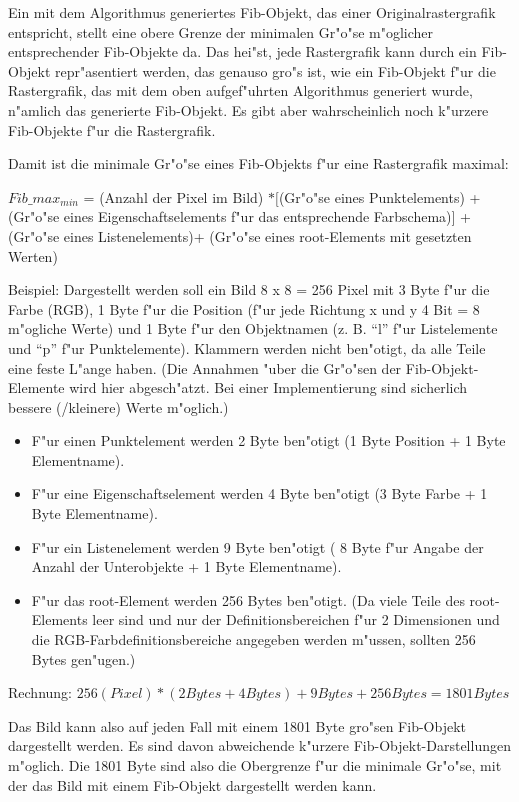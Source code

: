 Ein mit dem Algorithmus generiertes Fib-Objekt, das einer Originalrastergrafik entspricht, stellt eine obere Grenze der minimalen Gr"o"se m"oglicher entsprechender Fib-Objekte da. Das hei"st, jede Rastergrafik kann durch ein Fib-Objekt repr"asentiert werden, das genauso gro"s ist, wie ein Fib-Objekt f"ur die Rastergrafik, das mit dem oben aufgef"uhrten Algorithmus generiert wurde, n"amlich das generierte Fib-Objekt. Es gibt aber wahrscheinlich noch k"urzere Fib-Objekte f"ur die Rastergrafik.

\begin{flushleft}
Damit ist die minimale Gr"o"se eines Fib-Objekts f"ur eine Rastergrafik maximal:

$Fib\_max_{min}$ = (Anzahl der Pixel im Bild) $* [$(Gr"o"se eines Punktelements) + (Gr"o"se eines Eigenschaftselements f"ur das entsprechende Farbschema)$]$ + (Gr"o"se eines Listenelements)+ (Gr"o"se eines root-Elements mit gesetzten Werten)

\bigskip\noindent
Beispiel: Dargestellt werden soll ein Bild 8 x 8 = 256 Pixel mit 3 Byte f"ur die Farbe (RGB), 1 Byte f"ur die Position (f"ur jede Richtung x und y 4 Bit = 8 m"ogliche Werte) und 1 Byte f"ur den Objektnamen (z. B. ``l'' f"ur Listelemente und ``p'' f"ur Punktelemente). Klammern werden nicht ben"otigt, da alle Teile eine feste L"ange haben. (Die Annahmen "uber die Gr"o"sen der Fib-Objekt-Elemente wird hier abgesch"atzt. Bei einer Implementierung sind sicherlich bessere (/kleinere) Werte m"oglich.)
\begin{itemize}
 \item F"ur einen Punktelement werden 2 Byte ben"otigt (1 Byte Position + 1 Byte Elementname).
 \item F"ur eine Eigenschaftselement werden 4 Byte ben"otigt (3 Byte Farbe + 1 Byte Elementname).
 \item F"ur ein Listenelement werden 9 Byte ben"otigt ( 8 Byte f"ur Angabe der Anzahl der Unterobjekte + 1 Byte Elementname).
 \item F"ur das root-Element werden 256 Bytes ben"otigt. (Da viele Teile des root-Elements leer sind und nur der Definitionsbereichen f"ur 2 Dimensionen und die RGB-Farbdefinitionsbereiche angegeben werden m"ussen, sollten 256 Bytes gen"ugen.)
\end{itemize}

\bigskip\noindent
Rechnung:
$256 (Pixel) * (2 Bytes + 4 Bytes) + 9 Bytes + 256 Bytes = 1801 Bytes$

\bigskip\noindent
Das Bild kann also auf jeden Fall mit einem 1801 Byte gro"sen Fib-Objekt dargestellt werden. Es sind davon abweichende k"urzere Fib-Objekt-Darstellungen m"oglich. Die 1801 Byte sind also die Obergrenze f"ur die minimale Gr"o"se, mit der das Bild mit einem Fib-Objekt dargestellt werden kann.


\end{flushleft}
